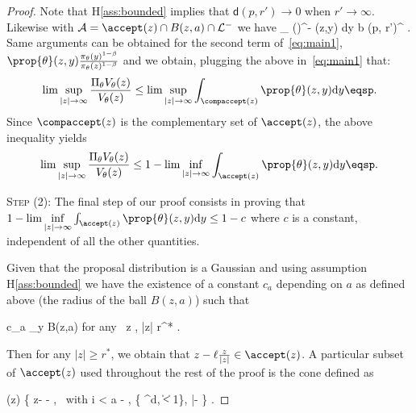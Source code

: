 \documentclass[letterpaper]{article} %
\begin{document}
\begin{proof}
Note that H\ref{ass:bounded} implies that $\mathsf{d}(p, r') \to 0$ when $r' \to \infty$.
Likewise with  $\mathcal{A} = \accept(z) \cap B(z,a) \cap \mathcal{L}^-$ we have
\beq
\int_{} ()^{-\beta} \prop{\theta}(z,y) \textrm{d}y  \leq b (p, r')^{\beta} \eqsp.
\eeq
Same arguments can be obtained for the second term of~\eqref{eq:main1}, \ie\ $\prop{\theta}(z,y) \frac{\pi_\theta(y)^{1-\beta}}{\pi_\theta(z)^{1-\beta}}$ and we obtain, plugging the above in~\eqref{eq:main1} that:
\begin{align}
\lim \sup \limits_{|z| \to \infty}  \frac{\Pi_\theta V_\theta(z)}{V_\theta(z)} \leq \lim \sup \limits_{|z| \to \infty}  \int_{\compaccept(z)} \prop{\theta}(z,y)  \textrm{d}y \eqsp.
\end{align}
Since $\compaccept(z)$ is the complementary set of $\accept(z)$, the above inequality yields
\begin{align}
\lim \sup \limits_{|z| \to \infty}  \frac{\Pi_\theta V_\theta(z)}{V_\theta(z)} \leq 1 - \lim \inf \limits_{|z| \to \infty}  \int_{\accept(z)} \prop{\theta}(z,y)  \textrm{d}y \eqsp.
\end{align}



\medskip
\noindent \textsc{Step (2): } The final step of our proof consists in proving that $1 - \lim \inf \limits_{|z| \to \infty}  \int_{\accept(z)} \prop{\theta}(z,y)  \textrm{d}y \leq 1 - c$ where $c$ is a constant, independent of all the other quantities.


Given that the proposal distribution is a Gaussian and using assumption H\ref{ass:bounded} we have the existence of a constant $c_a$ depending on $a$ as defined above (the radius of the ball $B(z,a)$) such that

\beq\label{eq:gauss}
 \leq  c_a \leq \inf \limits_{y \in B(z,a)}  \quad \textrm{for any} \, z \in \zset, |z| \geq r^* \eqsp.
\eeq

Then for any $|z| \geq r^*$, we obtain that $z- \ell \frac{z}{|z|} \in \accept(z)$.
A particular subset of $\accept(z)$ used throughout the rest of the proof is the cone defined as 

\beq\label{eq:defcone}
(z) \eqdef \{ z- \ell {} - \kappa \nu , \, \textrm{with} \quad i < a - \ell  , \nu \in \{ \nu \in \rset^d, \| \nu \| < 1\}, |\nu -  \leq {}   \} \eqsp.
\eeq


\end{proof}
\end{document}
